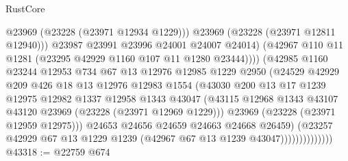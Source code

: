\begin{lexlean}{RustCore}
\begin{coremodule}
                                    @23969
                                    (@23228 (@23971 @12934 @1229)))
                                  @23969
                                  (@23228 (@23971 @12811 @12940)))
                                @23987
                                @23991
                                @23996
                                @24001
                                @24007
                                @24014)
                              (@42967 @110 @11 @1281 (@23295 @42929 @1160 @107 @11 @1280 @23444))))
                          (@42985
                            @1160
                            @23244
                            @12953
                            @734
                            @67
                            @13
                            @12976
                            @12985
                            @1229
                            @2950
                            (@24529
                              @42929
                              @209
                              @426
                              @18
                              @13
                              @12976
                              @12983
                              @1554
                              (@43030
                                @200
                                @13
                                @17
                                @1239
                                @12975
                                @12982
                                @1337
                                @12958
                                @1343
                                @43047
                                (@43115
                                  @12968
                                  @1343
                                  @43107
                                  @43120
                                  @23969
                                  (@23228 (@23971 @12969 @1229)))
                                @23969
                                (@23228 (@23971 @12959 @12975)))
                              @24653
                              @24656
                              @24659
                              @24663
                              @24668
                              @26459)
                            (@23257
                              @42929
                              @67
                              @13
                              @1229
                              @1239
                              (@42967 @67 @13 @1239 @43047))))))))))))))
@43318 := @22759 @674

\end{coremodule}
\end{lexlean}
